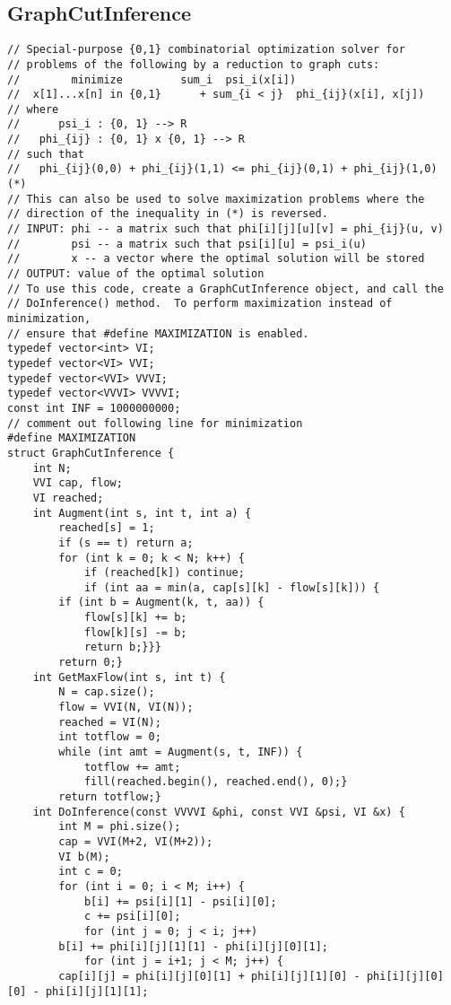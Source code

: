 \documentclass[8pt, oneside]{extarticle}
\begin{document}
\begin{multicols}{3}
\subsection{GraphCutInference}
\begin{lstlisting}
// Special-purpose {0,1} combinatorial optimization solver for
// problems of the following by a reduction to graph cuts:
//        minimize         sum_i  psi_i(x[i]) 
//  x[1]...x[n] in {0,1}      + sum_{i < j}  phi_{ij}(x[i], x[j])
// where
//      psi_i : {0, 1} --> R
//   phi_{ij} : {0, 1} x {0, 1} --> R
// such that
//   phi_{ij}(0,0) + phi_{ij}(1,1) <= phi_{ij}(0,1) + phi_{ij}(1,0)  (*)
// This can also be used to solve maximization problems where the
// direction of the inequality in (*) is reversed.
// INPUT: phi -- a matrix such that phi[i][j][u][v] = phi_{ij}(u, v)
//        psi -- a matrix such that psi[i][u] = psi_i(u)
//        x -- a vector where the optimal solution will be stored
// OUTPUT: value of the optimal solution
// To use this code, create a GraphCutInference object, and call the
// DoInference() method.  To perform maximization instead of minimization,
// ensure that #define MAXIMIZATION is enabled.
typedef vector<int> VI;
typedef vector<VI> VVI;
typedef vector<VVI> VVVI;
typedef vector<VVVI> VVVVI;
const int INF = 1000000000;
// comment out following line for minimization
#define MAXIMIZATION
struct GraphCutInference {
    int N;
    VVI cap, flow;
    VI reached;
    int Augment(int s, int t, int a) {
        reached[s] = 1;
        if (s == t) return a; 
        for (int k = 0; k < N; k++) {
            if (reached[k]) continue;
            if (int aa = min(a, cap[s][k] - flow[s][k])) {
        if (int b = Augment(k, t, aa)) {
            flow[s][k] += b;
            flow[k][s] -= b;
            return b;}}}
        return 0;}
    int GetMaxFlow(int s, int t) {
        N = cap.size();
        flow = VVI(N, VI(N));
        reached = VI(N);
        int totflow = 0;
        while (int amt = Augment(s, t, INF)) {
            totflow += amt;
            fill(reached.begin(), reached.end(), 0);}
        return totflow;}
    int DoInference(const VVVVI &phi, const VVI &psi, VI &x) {
        int M = phi.size();
        cap = VVI(M+2, VI(M+2));
        VI b(M);
        int c = 0;
        for (int i = 0; i < M; i++) {
            b[i] += psi[i][1] - psi[i][0];
            c += psi[i][0];
            for (int j = 0; j < i; j++)
        b[i] += phi[i][j][1][1] - phi[i][j][0][1];
            for (int j = i+1; j < M; j++) {
        cap[i][j] = phi[i][j][0][1] + phi[i][j][1][0] - phi[i][j][0][0] - phi[i][j][1][1];

\end{lstlisting}
\end{multicols}
\end{document}
